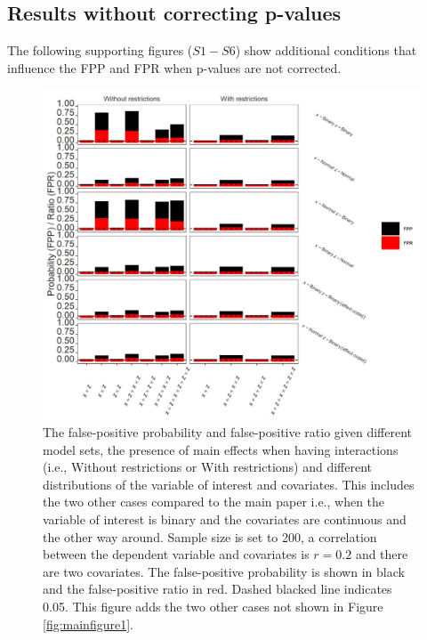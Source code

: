 \subsection{Results without correcting p-values}
The following supporting figures ($S1 - S6$) show additional conditions that influence the FPP and FPR when p-values are not corrected.

\label{result}
\begin{figure}[ht!]
\includegraphics[width=1\textwidth]{R/Analysis/Result/Figures/Figure1ASI.jpeg}
\centering
\caption{The false-positive probability and false-positive ratio given different model sets, the presence of main effects when having interactions (i.e., Without restrictions or With restrictions) and different distributions of the variable of interest and covariates. This includes the two other cases compared to the main paper i.e., when the variable of interest is binary and the covariates are continuous and the other way around. Sample size is set to 200, a correlation between the dependent variable and covariates is $\textit{r}=0.2$ and there are two covariates. The false-positive probability is shown in black and the false-positive ratio in red. Dashed blacked line indicates 0.05. This figure adds the two other cases not shown in Figure \ref{fig:mainfigure1}.}
\label{fig:appfigure1}
\end{figure}

